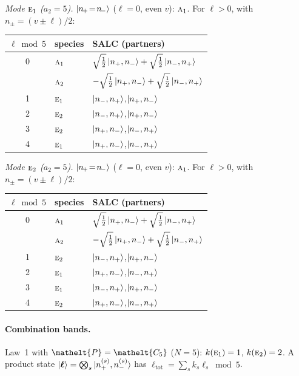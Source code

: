 \documentclass[11pt]{article}
\newcommand{\eltfont}[1]{{\let\sigma\eltsigma\mathelt{#1}}}
\newcommand{\irr}[1]{\text{\normalfont\scshape #1}}
\newcommand{\elt}[1]{\eltfont{#1}}
\newcommand{\pel}{\elt{P}}             %
\begin{document}
\emph{Mode $\irr{e}_{1}$ ($a_2=5$).} $\ket{n_{\!+}\!=\!n_{\!-}}$ ($\ell=0$, even $v$): $\irr{a}_{1}$. For $\ell>0$, with $n_\pm=(v\pm\ell)/2$:
\begin{longtable}{c l l}\hline $\ell\bmod 5$ & species & SALC (partners)\\ \hline\endhead
0 & $\irr{a}_{1}$ & $\sqrt{\tfrac{1}{2}}\ket{n_+,n_-}+\sqrt{\tfrac{1}{2}}\ket{n_-,n_+}$\\
 & $\irr{a}_{2}$ & $-\sqrt{\tfrac{1}{2}}\ket{n_+,n_-}+\sqrt{\tfrac{1}{2}}\ket{n_-,n_+}$\\
1 & $\irr{e}_{1}$ & $\ket{n_-,n_+}$,\quad $\ket{n_+,n_-}$\\
2 & $\irr{e}_{2}$ & $\ket{n_-,n_+}$,\quad $\ket{n_+,n_-}$\\
3 & $\irr{e}_{2}$ & $\ket{n_+,n_-}$,\quad $\ket{n_-,n_+}$\\
4 & $\irr{e}_{1}$ & $\ket{n_+,n_-}$,\quad $\ket{n_-,n_+}$\\
\hline\end{longtable}

\emph{Mode $\irr{e}_{2}$ ($a_2=5$).} $\ket{n_{\!+}\!=\!n_{\!-}}$ ($\ell=0$, even $v$): $\irr{a}_{1}$. For $\ell>0$, with $n_\pm=(v\pm\ell)/2$:
\begin{longtable}{c l l}\hline $\ell\bmod 5$ & species & SALC (partners)\\ \hline\endhead
0 & $\irr{a}_{1}$ & $\sqrt{\tfrac{1}{2}}\ket{n_+,n_-}+\sqrt{\tfrac{1}{2}}\ket{n_-,n_+}$\\
 & $\irr{a}_{2}$ & $-\sqrt{\tfrac{1}{2}}\ket{n_+,n_-}+\sqrt{\tfrac{1}{2}}\ket{n_-,n_+}$\\
1 & $\irr{e}_{2}$ & $\ket{n_-,n_+}$,\quad $\ket{n_+,n_-}$\\
2 & $\irr{e}_{1}$ & $\ket{n_+,n_-}$,\quad $\ket{n_-,n_+}$\\
3 & $\irr{e}_{1}$ & $\ket{n_-,n_+}$,\quad $\ket{n_+,n_-}$\\
4 & $\irr{e}_{2}$ & $\ket{n_+,n_-}$,\quad $\ket{n_-,n_+}$\\
\hline\end{longtable}

\paragraph{Combination bands.}

Law~1 with $\pel=\elt{C_{5}}$ ($N=5$): $k(\irr{e}_{1})=1$, $k(\irr{e}_{2})=2$. A product state $\ket{\boldsymbol\ell}=\bigotimes_s\ket{n_+^{(s)},n_-^{(s)}}$ has $\ell_{\mathrm{tot}}=\sum_sk_s\ell_s\bmod 5$.
\end{document}
